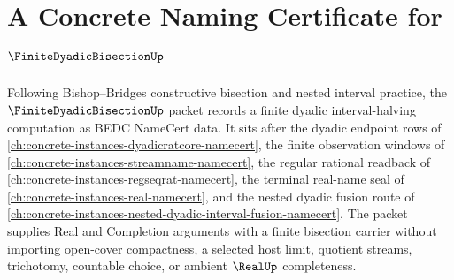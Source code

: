\chapter{A Concrete Naming Certificate for $\FiniteDyadicBisectionUp$}
\label{ch:concrete-instances-finite-dyadic-bisection-namecert}

Following Bishop--Bridges constructive bisection and nested interval practice, the $\FiniteDyadicBisectionUp$ packet records a finite dyadic interval-halving computation as BEDC NameCert data. It sits after the dyadic endpoint rows of \autoref{ch:concrete-instances-dyadicratcore-namecert}, the finite observation windows of \autoref{ch:concrete-instances-streamname-namecert}, the regular rational readback of \autoref{ch:concrete-instances-regseqrat-namecert}, the terminal real-name seal of \autoref{ch:concrete-instances-real-namecert}, and the nested dyadic fusion route of \autoref{ch:concrete-instances-nested-dyadic-interval-fusion-namecert}. The packet supplies Real and Completion arguments with a finite bisection carrier without importing open-cover compactness, a selected host limit, quotient streams, trichotomy, countable choice, or ambient $\RealUp$ completeness.

